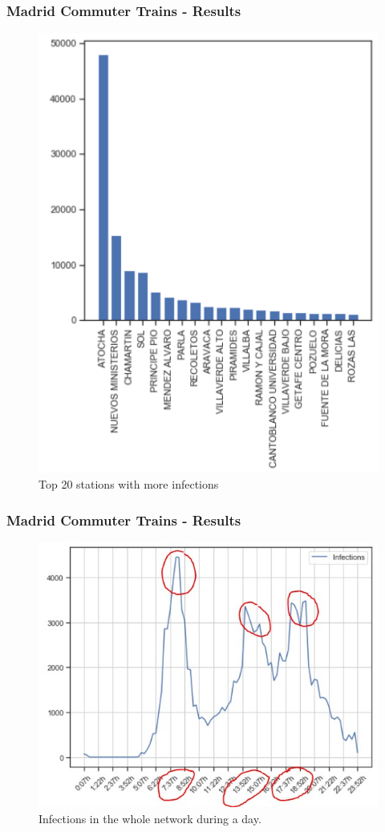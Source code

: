 \documentclass{beamer}
\begin{document}
\begin{frame}
\frametitle{Madrid Commuter Trains - Results}
\begin{figure}
	\centering
	\includegraphics[width=.4\linewidth]{Scratch_Visuals/madrid-cercanias-stats-top20.png}
	\caption{Top 20 stations with more infections}
\end{figure}
\end{frame}
\begin{frame}
\frametitle{Madrid Commuter Trains - Results}
\begin{figure}
\centering
\includegraphics[width=.6\linewidth]{Scratch_Visuals/madrid-infection-timeline.jpg}
\caption{Infections in the whole network during a day.}
\end{figure}
\end{frame}
\end{document}
